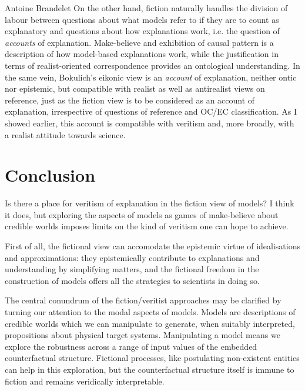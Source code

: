 \begin{artengenv}{Antoine Brandelet}
On the other hand, fiction naturally handles the division of labour between questions about what models refer to if they are to count as explanatory and questions about how explanations work, i.e. the question of \textit{accounts} of explanation. Make-believe and exhibition of causal pattern is a description of how model-based explanations work, while the justification in terms of realist-oriented correspondence provides an ontological understanding. In the same vein, Bokulich's eikonic view is an \textit{account} of explanation, neither ontic nor epistemic, but compatible with realist as well as antirealist views on reference, just as the fiction view is to be considered as an account of explanation, irrespective of questions of reference and OC/EC classification. As I showed earlier, this account is compatible with veritism and, more broadly, with a realist attitude towards science.



\section{Conclusion}\label{sec:conclusion}


Is there a place for veritism of explanation in the fiction view of models? I think it does, but exploring the aspects of models as games of make-believe about credible worlds imposes limits on the kind of veritism one can hope to achieve.

First of all, the fictional view can accomodate the epistemic virtue of idealisations and approximations: they epistemically contribute to explanations and understanding by simplifying matters, and the fictional freedom in the construction of models offers all the strategies to scientists in doing so.

The central conundrum of the fiction/veritist approaches may be clarified by turning our attention to the modal aspects of models. Models are descriptions of credible worlds which we can manipulate to generate, when suitably interpreted, propositions about physical target systems. Manipulating a model means we explore the robustness across a range of input values of the embedded counterfactual structure. Fictional processes, like postulating non-existent entities can help in this exploration, but the counterfactual structure itself is immune to fiction and remains veridically interpretable.


\end{artengenv}
